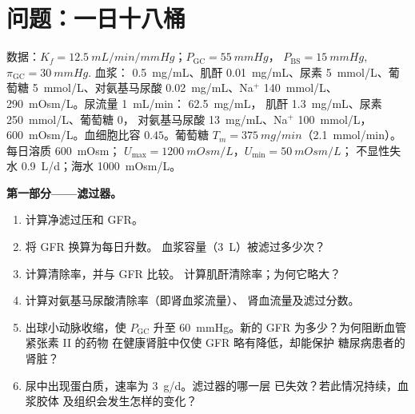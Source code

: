 \section{问题：一日十八桶}

\begin{problem}
\label{pb:b3:renal-osmoregulation:1}
数据：$K_{f} = \qty{12.5}{mL/min/mmHg}$；$P_{\text{GC}} = \qty{55}{mmHg}$，
$P_{\text{BS}} = \qty{15}{mmHg}$, $\pi_{\text{GC}} = \qty{30}{mmHg}$.
血浆： \qty{0.5}{mg/mL}、肌酐 \qty{0.01}{mg/mL}、尿素
\qty{5}{mmol/L}、葡萄糖 \qty{5}{mmol/L}、对氨基马尿酸
\qty{0.02}{mg/mL}、Na$^{+}$ \qty{140}{mmol/L}、
\qty{290}{mOsm/L}。尿流量 \qty{1}{mL/min}： \qty{62.5}{mg/mL}，
肌酐 \qty{1.3}{mg/mL}、尿素 \qty{250}{mmol/L}、葡萄糖 $0$，
对氨基马尿酸 \qty{13}{mg/mL}、Na$^{+}$ \qty{100}{mmol/L}，
 \qty{600}{mOsm/L}。血细胞比容 $0.45$。葡萄糖 $T_{m} =
\qty{375}{mg/min}$（\qty{2.1}{mmol/min}）。每日溶质 \qty{600}{mOsm}；
$U_{\max} = \qty{1200}{mOsm/L}$，$U_{\min} = \qty{50}{mOsm/L}$；
不显性失水 \qty{0.9}{L/d}；海水 \qty{1000}{mOsm/L}。

\medskip
\noindent\textbf{第一部分——滤过器。}
\begin{enumerate}
  \item 计算净滤过压和 GFR。
  \item 将 GFR 换算为每日升数。
        血浆容量（\qty{3}{L}）被滤过多少次？
  \item 计算清除率，并与 GFR 比较。
        计算肌酐清除率；为何它略大？
  \item 计算对氨基马尿酸清除率（即肾血浆流量）、
        肾血流量及滤过分数。
  \item 出球小动脉收缩，使 $P_{\text{GC}}$ 升至
        \qty{60}{mmHg}。新的 GFR 为多少？为何阻断血管紧张素 II 的药物
        在健康肾脏中仅使 GFR 略有降低，却能保护
        糖尿病患者的肾脏？
  \item 尿中出现蛋白质，速率为 \qty{3}{g/d}。滤过器的哪一层
        已失效？若此情况持续，血浆胶体
        及组织会发生怎样的变化？
\end{enumerate}


\end{problem}
